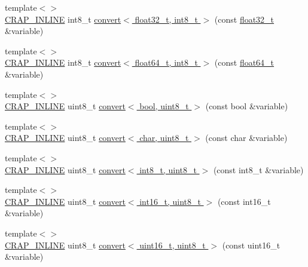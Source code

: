 \begin{DoxyCompactItemize}
\item 
{\footnotesize template$<$$>$ }\\\hyperlink{config__x86_8h_a5a40526b8d842e7ff731509998bb0f1c}{C\+R\+A\+P\+\_\+\+I\+N\+L\+I\+N\+E} int8\+\_\+t \hyperlink{namespacecrap_a90fd8cf1e4590717d24b9215c3da7f4d}{convert$<$ float32\+\_\+t, int8\+\_\+t $>$} (const \hyperlink{crap__types_8h_a4611b605e45ab401f02cab15c5e38715}{float32\+\_\+t} \&variable)
\item 
{\footnotesize template$<$$>$ }\\\hyperlink{config__x86_8h_a5a40526b8d842e7ff731509998bb0f1c}{C\+R\+A\+P\+\_\+\+I\+N\+L\+I\+N\+E} int8\+\_\+t \hyperlink{namespacecrap_ab5e03f38a90c76bf23317e17a21989c9}{convert$<$ float64\+\_\+t, int8\+\_\+t $>$} (const \hyperlink{crap__types_8h_ac55f3ae81b5bc9053760baacf57e47f4}{float64\+\_\+t} \&variable)
\item 
{\footnotesize template$<$$>$ }\\\hyperlink{config__x86_8h_a5a40526b8d842e7ff731509998bb0f1c}{C\+R\+A\+P\+\_\+\+I\+N\+L\+I\+N\+E} uint8\+\_\+t \hyperlink{namespacecrap_a415eb57c20641aeeccc125acea0ca91e}{convert$<$ bool, uint8\+\_\+t $>$} (const bool \&variable)
\item 
{\footnotesize template$<$$>$ }\\\hyperlink{config__x86_8h_a5a40526b8d842e7ff731509998bb0f1c}{C\+R\+A\+P\+\_\+\+I\+N\+L\+I\+N\+E} uint8\+\_\+t \hyperlink{namespacecrap_a28d731469eb316297452b37b8d924408}{convert$<$ char, uint8\+\_\+t $>$} (const char \&variable)
\item 
{\footnotesize template$<$$>$ }\\\hyperlink{config__x86_8h_a5a40526b8d842e7ff731509998bb0f1c}{C\+R\+A\+P\+\_\+\+I\+N\+L\+I\+N\+E} uint8\+\_\+t \hyperlink{namespacecrap_a7a03815a8615d59811b1b92f6ba456e4}{convert$<$ int8\+\_\+t, uint8\+\_\+t $>$} (const int8\+\_\+t \&variable)
\item 
{\footnotesize template$<$$>$ }\\\hyperlink{config__x86_8h_a5a40526b8d842e7ff731509998bb0f1c}{C\+R\+A\+P\+\_\+\+I\+N\+L\+I\+N\+E} uint8\+\_\+t \hyperlink{namespacecrap_afdda55be48d0315d4351964701ab4554}{convert$<$ int16\+\_\+t, uint8\+\_\+t $>$} (const int16\+\_\+t \&variable)
\item 
{\footnotesize template$<$$>$ }\\\hyperlink{config__x86_8h_a5a40526b8d842e7ff731509998bb0f1c}{C\+R\+A\+P\+\_\+\+I\+N\+L\+I\+N\+E} uint8\+\_\+t \hyperlink{namespacecrap_a93a5a7c93915258bf8d7e05fa0382a31}{convert$<$ uint16\+\_\+t, uint8\+\_\+t $>$} (const uint16\+\_\+t \&variable)

\end{DoxyCompactItemize}

